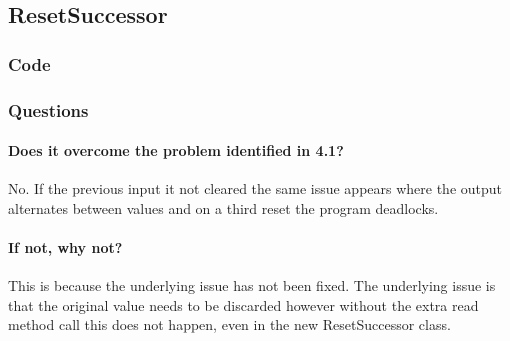 \subsection{ResetSuccessor}

\subsubsection*{Code}




\subsubsection*{Questions}

\paragraph{Does it overcome the problem identified in 4.1?}

No.  If the previous input it not cleared the same issue appears where the output alternates between values and on a third reset the program deadlocks.

\paragraph{If not, why not?}

This is because the underlying issue has not been fixed.  The underlying issue is that the original value needs to be discarded however without the extra read method call this does not happen, even in the new ResetSuccessor class.